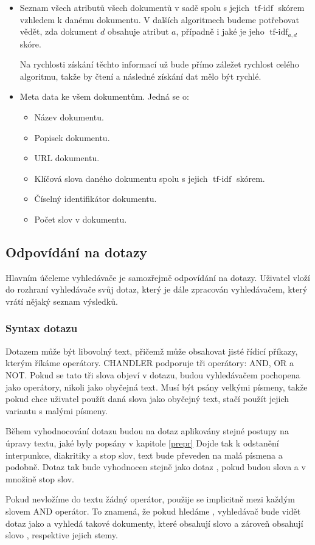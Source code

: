 \documentclass[12pt]{article}
\newcommand{\name}{CHANDLER}
\newcommand{\ssection}[1]{\subsection{#1}}
\newcommand{\sssection}[1]{\subsubsection{#1}}
\DeclareMathOperator{\tfidf}{tf-idf}
\begin{document}
\begin{itemize}
\item Seznam všech atributů všech dokumentů v sadě spolu s jejich $\tfidf$ skórem vzhledem k danému dokumentu. V dalších algoritmech budeme potřebovat vědět, zda dokument $d$ obsahuje atribut $a$, případně i jaké je jeho $\tfidf_{a, d}$ skóre. 

Na rychlosti získání těchto informací už bude přímo záležet rychlost celého algoritmu, takže by čtení a následné získání dat mělo být rychlé. 

\item Meta data ke všem dokumentům. Jedná se o:
	\begin{itemize}
	\item Název dokumentu. 
	\item Popisek dokumentu.
	\item URL dokumentu. 
	\item Klíčová slova daného dokumentu spolu s jejich $\tfidf$ skórem. 
	\item Číselný identifikátor dokumentu.
	\item Počet slov v dokumentu. 
	\end{itemize}
\end{itemize}




\ssection{Odpovídání na dotazy}
Hlavním účeleme vyhledávače je samozřejmě odpovídání na dotazy. Uživatel vloží do rozhraní vyhledávače svůj dotaz, který je dále zpracován vyhledávačem, který vrátí nějaký seznam výsledků. 

\sssection{Syntax dotazu}
Dotazem může být libovolný text, přičemž může obsahovat jisté řídicí příkazy, kterým říkáme operátory. \name{} podporuje tři operátory: AND, OR a NOT. Pokud se tato tři slova objeví v dotazu, budou vyhledávačem pochopena jako operátory, nikoli jako obyčejná text. Musí být psány velkými písmeny, takže pokud chce uživatel použít daná slova jako obyčejný text, stačí použít jejich variantu s malými písmeny. 

Během vyhodnocování dotazu budou na dotaz aplikovány stejné postupy na úpravy textu, jaké byly popsány v kapitole \ref{prepr} Dojde tak k odstanění interpunkce, diakritiky a stop slov, text bude převeden na malá písmena a podobně. Dotaz  tak bude vyhodnocen stejně jako dotaz , pokud budou slova  a  v množině stop slov. 

Pokud nevložíme do textu žádný operátor, použije se implicitně mezi každým slovem AND operátor. To znamená, že pokud hledáme , vyhledávač bude vidět dotaz jako  a vyhledá takové dokumenty, které obsahují slovo  a zároveň obsahují slovo , respektive jejich stemy. 
\end{document}
